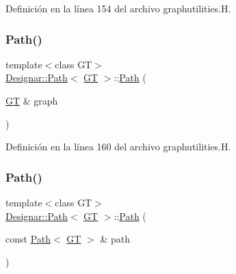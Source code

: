 Definición en la línea 154 del archivo graphutilities.\+H.

\mbox{\label{class_designar_1_1_path_a92b56646f20bdce1ed05601b983235d6}} 
\subsubsection{\texorpdfstring{Path()}{Path()}\hspace{0.1cm}{\footnotesize\ttfamily [2/4]}}
{\footnotesize\ttfamily template$<$class GT$>$ \\
\hyperlink{class_designar_1_1_path}{Designar\+::\+Path}$<$ \hyperlink{demo-buildgraph_8_c_a3001c40d2c31ca87ed96cd7d1334a55e}{GT} $>$\+::\hyperlink{class_designar_1_1_path}{Path} (\begin{DoxyParamCaption}\item[{\hyperlink{demo-buildgraph_8_c_a3001c40d2c31ca87ed96cd7d1334a55e}{GT} \&}]{graph }\end{DoxyParamCaption})\hspace{0.3cm}{\ttfamily [inline]}}



Definición en la línea 160 del archivo graphutilities.\+H.

\mbox{\label{class_designar_1_1_path_a9dc80e39b78c86740d5731899f5cb204}} 
\subsubsection{\texorpdfstring{Path()}{Path()}\hspace{0.1cm}{\footnotesize\ttfamily [3/4]}}
{\footnotesize\ttfamily template$<$class GT$>$ \\
\hyperlink{class_designar_1_1_path}{Designar\+::\+Path}$<$ \hyperlink{demo-buildgraph_8_c_a3001c40d2c31ca87ed96cd7d1334a55e}{GT} $>$\+::\hyperlink{class_designar_1_1_path}{Path} (\begin{DoxyParamCaption}\item[{const \hyperlink{class_designar_1_1_path}{Path}$<$ \hyperlink{demo-buildgraph_8_c_a3001c40d2c31ca87ed96cd7d1334a55e}{GT} $>$ \&}]{path }\end{DoxyParamCaption})\hspace{0.3cm}{\ttfamily [inline]}}



